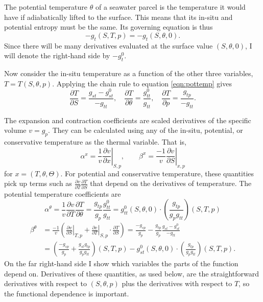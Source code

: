 \documentclass{article}
\begin{document}
The potential temperature $\theta$ of a seawater parcel is the temperature it would have if adiabatically lifted to the surface. This means that its in-situ and potential entropy must be the same. Its governing equation is thus
\begin{equation}\label{eqn:pottemp}
    -g_t(S,T,p) = -g_t(S,\theta,0).
\end{equation}
Since there will be many derivatives evaluated at the surface value $(S,\theta,0)$, I will denote the right-hand side by $-g^0_t$.

Now consider the in-situ temperature as a function of the other three variables, $T = T(S,\theta,p)$. Applying the chain rule to equation \ref{eqn:pottemp} gives
\begin{equation}\label{eqn:tpotderivs}
    \frac{\partial T}{\partial S} = \frac{g_{st}-g^0_{st}}{-g_{tt}}, \quad \frac{\partial T}{\partial \theta} = \frac{g^0_{tt}}{g_{tt}}, \quad \frac{\partial T}{\partial p} = \frac{g_{tp}}{-g_{tt}}.
\end{equation}

The expansion and contraction coefficients are scaled derivatives of the specific volume $v = g_p$. They can be calculated using any of the in-situ, potential, or conservative temperature as the thermal variable. That is,
\begin{equation*}
    \alpha^x = \left. \frac{1}{v} \frac{\partial v}{\partial x} \right|_{S,p}, \qquad \beta^x = \left. \frac{-1}{v} \frac{\partial v}{\partial S} \right|_{x,p}
\end{equation*}
for $x = (T,\theta,\Theta)$. For potential and conservative temperature, these quantities pick up terms such as $\frac{\partial v}{\partial T} \frac{\partial T}{\partial S}$ that depend on the derivatives of temperature. The potential temperature coefficients are
\begin{equation*}
    \alpha^{\theta} = \frac{1}{v} \frac{\partial v}{\partial T} \frac{\partial T}{\partial \theta} = \frac{g_{tp}}{g_p} \frac{g^0_{tt}}{g_{tt}} = g^0_{tt}(S,\theta,0) \cdot \left( \frac{g_{tp}}{g_p g_{tt}} \right) (S,T,p)
\end{equation*}
\begin{align*}
    \beta^{\theta} &= \frac{-1}{v} \left( \left. \frac{\partial v}{\partial S} \right|_{T,p} + \left. \frac{\partial v}{\partial T} \right|_{S,p} \cdot \frac{\partial T}{\partial S} \right) = \frac{-g_{sp}}{g_p} - \frac{g_{tp}}{g_p} \frac{g_{st}-g^0_{st}}{-g_{tt}} \\
    &= \left( \frac{-g_{sp}}{g_p} + \frac{g_{st} g_{tp}}{g_p g_{tt}} \right)(S,T,p) - g^0_{st}(S,\theta,0) \cdot \left( \frac{g_{tp}}{g_p g_{tt}} \right)(S,T,p).
\end{align*}
On the far right-hand side I show which variables the parts of the function depend on. Derivatives of these quantities, as used below, are the straightforward derivatives with respect to $(S,\theta,p)$ plus the derivatives with respect to $T$, so the functional dependence is important.
\end{document}

